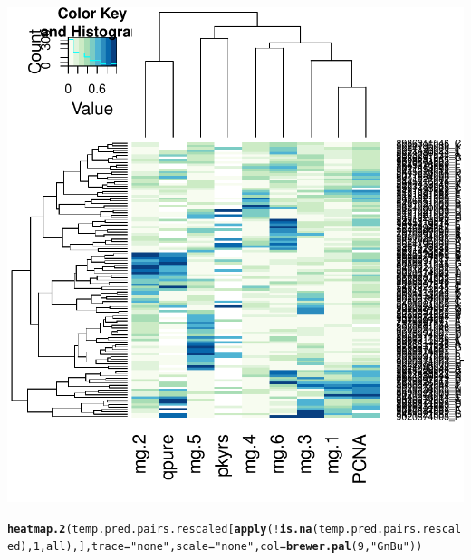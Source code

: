 \documentclass{article}\usepackage[]{graphicx}\usepackage[]{color}
\makeatletter
\def\maxwidth{ %
  \ifdim\Gin@nat@width>\linewidth
    \linewidth
  \else
    \Gin@nat@width
  \fi
}
\newcommand{\hlnum}[1]{\textcolor[rgb]{0.686,0.059,0.569}{#1}}%
\newcommand{\hlstr}[1]{\textcolor[rgb]{0.192,0.494,0.8}{#1}}%
\newcommand{\hlopt}[1]{\textcolor[rgb]{0,0,0}{#1}}%
\newcommand{\hlstd}[1]{\textcolor[rgb]{0.345,0.345,0.345}{#1}}%
\newcommand{\hlkwc}[1]{\textcolor[rgb]{0.333,0.667,0.333}{#1}}%
\newcommand{\hlkwd}[1]{\textcolor[rgb]{0.737,0.353,0.396}{\textbf{#1}}}%
\newenvironment{kframe}{%
 \def\at@end@of@kframe{}%
 \ifinner\ifhmode%
  \def\at@end@of@kframe{\end{minipage}}%
  \begin{minipage}{\columnwidth}%
 \fi\fi%
 \def\FrameCommand##1{\hskip\@totalleftmargin \hskip-\fboxsep
 \colorbox{shadecolor}{##1}\hskip-\fboxsep
     \hskip-\linewidth \hskip-\@totalleftmargin \hskip\columnwidth}%
 \MakeFramed {\advance\hsize-\width
   \@totalleftmargin\z@ \linewidth\hsize
   \@setminipage}}%
 {\par\unskip\endMakeFramed%
 \at@end@of@kframe}
\newenvironment{knitrout}{}{} %
\makeatother
\begin{document}
\begin{knitrout}
{\centering \includegraphics[width=\maxwidth]{figure/metagene-pairs-2} 

}


\begin{kframe}\begin{alltt}
\hlkwd{heatmap.2}\hlstd{(temp.pred.pairs.rescaled[}\hlkwd{apply}\hlstd{(}\hlopt{!}\hlkwd{is.na}\hlstd{(temp.pred.pairs.rescaled),} \hlnum{1}\hlstd{, all),],} \hlkwc{trace} \hlstd{=} \hlstr{"none"}\hlstd{,} \hlkwc{scale} \hlstd{=} \hlstr{"none"}\hlstd{,} \hlkwc{col} \hlstd{=} \hlkwd{brewer.pal}\hlstd{(}\hlnum{9}\hlstd{,} \hlstr{"GnBu"}\hlstd{))}
\end{alltt}
\end{kframe}


\end{knitrout}
\end{document}
